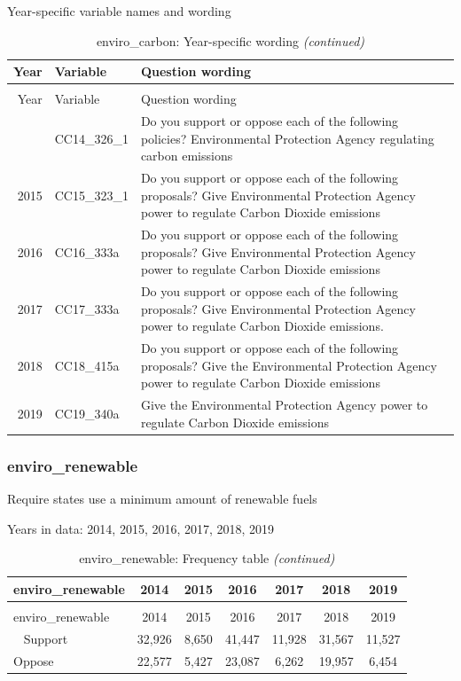 \documentclass[12pt]{article}
\begin{document}
Year-specific variable names and wording

\begin{longtable}[t]{rl>{\raggedright\arraybackslash}p{10cm}}
\caption{\label{tab:unnamed-chunk-4}enviro\_carbon: Year-specific wording}\\
\toprule
Year & Variable & Question wording\\
\midrule
\endfirsthead
\caption[]{enviro\_carbon: Year-specific wording \textit{(continued)}}\\
\toprule
Year & Variable & Question wording\\
\midrule
\endhead
\
\endfoot
\bottomrule
\endlastfoot
2014 & CC14\_326\_1 & Do you support or oppose each of the following policies? Environmental Protection Agency regulating carbon emissions\\
2015 & CC15\_323\_1 & Do you support or oppose each of the following proposals? Give Environmental Protection Agency power to regulate Carbon Dioxide emissions\\
2016 & CC16\_333a & Do you support or oppose each of the following proposals? Give Environmental Protection Agency power to regulate Carbon Dioxide emissions\\
2017 & CC17\_333a & Do you support or oppose each of the following proposals? Give Environmental Protection Agency power to regulate Carbon Dioxide emissions.\\
2018 & CC18\_415a & Do you support or oppose each of the following proposals? Give the Environmental Protection Agency power to regulate Carbon Dioxide emissions\\
2019 & CC19\_340a & Give the Environmental Protection Agency power to regulate Carbon Dioxide emissions\\*
\end{longtable}

\subsubsection{enviro\_renewable}\label{enviro_renewable}

Require states use a minimum amount of renewable fuels

Years in data: 2014, 2015, 2016, 2017, 2018, 2019

\begin{longtable}[t]{lcccccc}
\caption{\label{tab:unnamed-chunk-4}enviro\_renewable: Frequency table}\\
\toprule
enviro\_renewable & 2014 & 2015 & 2016 & 2017 & 2018 & 2019\\
\midrule
\endfirsthead
\caption[]{enviro\_renewable: Frequency table \textit{(continued)}}\\
\toprule
enviro\_renewable & 2014 & 2015 & 2016 & 2017 & 2018 & 2019\\
\midrule
\endhead
\
\endfoot
\bottomrule
\endlastfoot
Support & 32,926 & 8,650 & 41,447 & 11,928 & 31,567 & 11,527\\
Oppose & 22,577 & 5,427 & 23,087 & 6,262 & 19,957 & 6,454\\*
\end{longtable}
\end{document}
